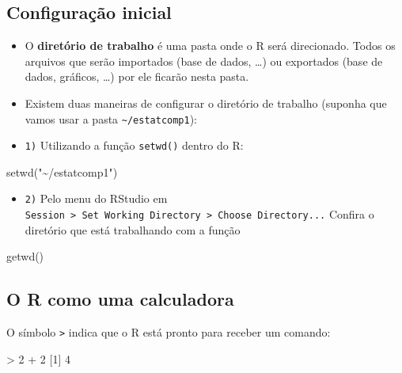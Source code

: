 \documentclass[
  10pt,
  a4paper]{book}
\newenvironment{Shaded}{\begin{snugshade}}{\end{snugshade}}
\newcommand{\DecValTok}[1]{\textcolor[rgb]{0.00,0.00,0.81}{#1}}
\newcommand{\FunctionTok}[1]{\textcolor[rgb]{0.00,0.00,0.00}{#1}}
\newcommand{\NormalTok}[1]{#1}
\newcommand{\SpecialCharTok}[1]{\textcolor[rgb]{0.00,0.00,0.00}{#1}}
\newcommand{\StringTok}[1]{\textcolor[rgb]{0.31,0.60,0.02}{#1}}
\providecommand{\tightlist}{%
  \setlength{\itemsep}{0pt}\setlength{\parskip}{0pt}}
\begin{document}
\hypertarget{configurauxe7uxe3o-inicial}{%
\subsection{Configuração inicial}\label{configurauxe7uxe3o-inicial}}

\begin{itemize}
\item
  O \textbf{diretório de trabalho} é uma pasta onde o R será
  direcionado. Todos os arquivos que serão importados (base de dados,
  \ldots) ou exportados (base de dados, gráficos, \ldots) por ele
  ficarão nesta pasta.
\item
  Existem duas maneiras de configurar o
  diretório de trabalho (suponha que vamos usar a pasta
  \texttt{\textasciitilde{}/estatcomp1}):
\item
  \texttt{1)} Utilizando a função \texttt{setwd()} dentro do R:
\end{itemize}

\begin{Shaded}
\begin{Highlighting}[]
\FunctionTok{setwd}\NormalTok{(}\StringTok{"\textasciitilde{}/estatcomp1"}\NormalTok{)}
\end{Highlighting}
\end{Shaded}

\begin{itemize}
\tightlist
\item
  \texttt{2)} Pelo menu do RStudio em \texttt{Session\ \textgreater{}\ Set\ Working\ Directory\ \textgreater{}\ Choose\ Directory...}
  Confira o diretório que está trabalhando com a função
\end{itemize}

\begin{Shaded}
\begin{Highlighting}[]
\FunctionTok{getwd}\NormalTok{()}
\end{Highlighting}
\end{Shaded}

\hypertarget{o-r-como-uma-calculadora}{%
\subsection{O R como uma calculadora}\label{o-r-como-uma-calculadora}}

O símbolo \texttt{\textgreater{}} indica que o R está pronto para receber um comando:

\begin{Shaded}
\begin{Highlighting}[]
\SpecialCharTok{\textgreater{}} \DecValTok{2} \SpecialCharTok{+} \DecValTok{2}
\NormalTok{[}\DecValTok{1}\NormalTok{] }\DecValTok{4}
\end{Highlighting}
\end{Shaded}
\end{document}
